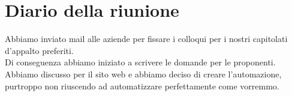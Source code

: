 \section{Diario della riunione}

	Abbiamo inviato mail alle aziende per fissare i colloqui per i nostri capitolati d'appalto preferiti.\\
	Di conseguenza abbiamo iniziato a scrivere le domande per le proponenti.\\
	Abbiamo discusso per il sito web e abbiamo deciso di creare l'automazione, purtroppo non riuscendo ad automatizzare perfettamente come vorremmo.\\
	